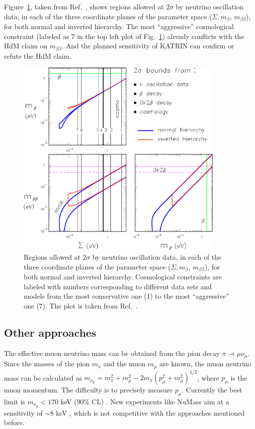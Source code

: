 Figure~\ref{fig:sum1b2b}, taken from Ref.~\cite{Fog07}, shows regions
allowed at $2\sigma$ by neutrino oscillation data, in each of the
three coordinate planes of the parameter space ($\Sigma, m_{\beta}$,
$m_{\beta\beta}$), for both normal and inverted hierarchy. The most
``aggressive'' cosmological constraint (labeled as 7 in the top left
plot of Fig.~\ref{fig:sum1b2b}) already conflicts with the HdM claim
on $m_{\beta\beta}$. And the planned sensitivity of KATRIN can confirm
or refute the HdM claim.
\begin{figure}[tbhp]
\centering
\includegraphics[width=0.9\textwidth]{sum1b2b}  
\caption{Regions allowed at $2\sigma$ by neutrino oscillation data, in
each of the three coordinate planes of the parameter space ($\Sigma,
m_{\beta}$, $m_{\beta\beta}$), for both normal and inverted
hierarchy. Cosmological constraints are labeled with numbers
corresponding to different data sets and models from the most
conservative one (1) to the most ``aggressive'' one (7). The plot is
taken from Ref.~\cite{Fog07}.}
\label{fig:sum1b2b}
\end{figure}

\subsection{Other approaches}
\label{sec:otap}
The effective muon neutrino mass can be obtained from the pion decay
$\pi \rightarrow \mu \nu_{\mu}$. Since the masses of the pion
$m_{\pi}$ and the muon $m_{\mu}$ are known, the muon neutrino mass can
be calculated as $m_{\nu_{\mu}} = m^{2}_{\pi} + m^{2}_{\mu} - 2m_{\pi}
(p^{2}_{\mu} + m^{2}_{\mu})^{1/2}$, where $p_{\mu}$ is the muon
momentum. The difficulty is to precisely measure $p_{\mu}$. Currently
the best limit is $m_{\nu_{\mu}} < 170$ keV (90\% CL)
\cite{Ass96}. New experiments like NuMass aim at a sensitivity of
$\sim 8$ keV \cite{Num20}, which is not competitive with the
approaches mentioned before.

